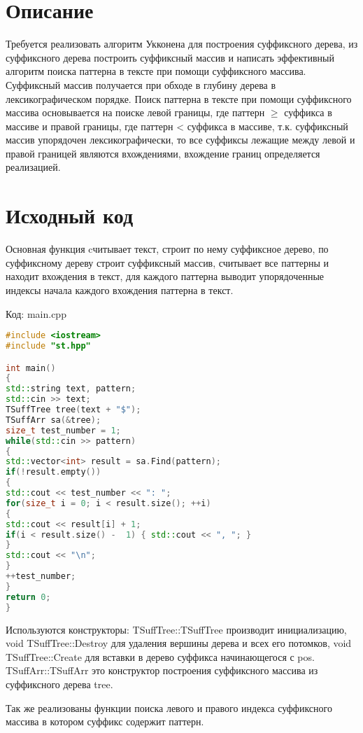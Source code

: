 \section{Описание}
Требуется реализовать алгоритм Укконена для построения суффиксного дерева, из
суффиксного дерева построить суффиксный массив и написать эффективный алгоритм поиска паттерна в тексте при помощи суффиксного массива. 
Суффиксный массив получается при обходе в глубину дерева в лексикографическом порядке. 
Поиск паттерна в тексте при помощи суффиксного массива основывается на поиске
левой границы, где паттерн $\geq$ суффикса в массиве и правой границы, где паттерн
< суффикса в массиве, т.к. суффиксный массив упорядочен лексикографически, то
все суффиксы лежащие между левой и правой границей являются вхождениями,
вхождение границ определяется реализацией.
\pagebreak

\section{Исходный код}
Основная функция cчитывает текст, строит по нему суффиксное дерево, по суффиксному дереву строит суффиксный массив, 
считывает все паттерны и находит вхождения в текст,
для каждого паттерна выводит упорядоченные индексы начала каждого вхождения паттерна в текст.

Код: main.cpp
\begin{lstlisting}[language=C++]
#include <iostream>
#include "st.hpp"

int main()
{
std::string text, pattern;
std::cin >> text;
TSuffTree tree(text + "$");
TSuffArr sa(&tree);
size_t test_number = 1;
while(std::cin >> pattern)
{
std::vector<int> result = sa.Find(pattern);
if(!result.empty())
{
std::cout << test_number << ": ";
for(size_t i = 0; i < result.size(); ++i)
{
std::cout << result[i] + 1;
if(i < result.size() -  1) { std::cout << ", "; }
}
std::cout << "\n";
}
++test_number;
}
return 0;
}
\end{lstlisting}

Используются конструкторы: TSuffTree::TSuffTree производит инициализацию, void TSuffTree::Destroy для  удаления вершины дерева и всех его потомков,
void TSuffTree::Create для вставки в дерево суффикса начинающегося с pos.
TSuffArr::TSuffArr это конструктор построения суффиксного массива из суффиксного дерева tree.

Так же реализованы функции поиска левого и правого индекса суффиксного массива в котором суффикс содержит паттерн.

